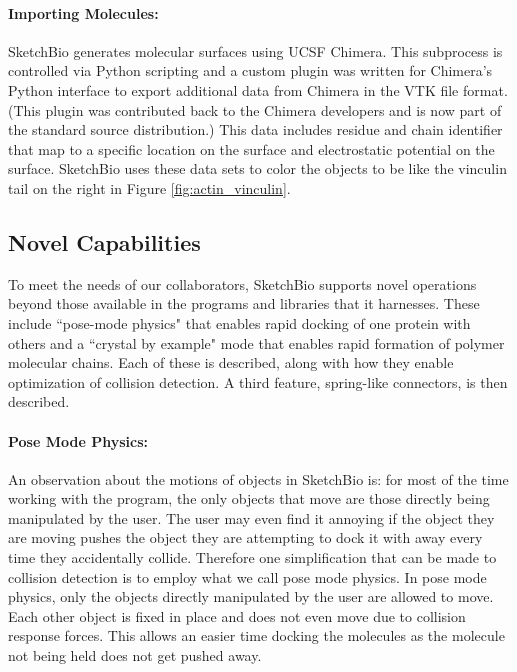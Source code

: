 \documentclass[twocolumn]{bmcart}%
\begin{document}
\paragraph*{Importing Molecules:}
SketchBio generates molecular surfaces using UCSF Chimera.
This subprocess is controlled via Python scripting and a custom plugin was written for Chimera's Python interface to export additional data from Chimera in the VTK file format.
(This plugin was contributed back to the Chimera developers and is now part of the standard source distribution.)
This data includes residue and chain identifier that map to a specific location on the surface and electrostatic potential on the surface.
SketchBio uses these data sets to color the objects to be like the vinculin tail on the right in Figure \ref{fig:actin_vinculin}.

\subsection*{Novel Capabilities}

To meet the needs of our collaborators, SketchBio supports novel operations beyond those available in the programs and libraries that it harnesses.
These include ``pose-mode physics" that enables rapid docking of one protein with others and a ``crystal by example" mode that enables rapid formation of polymer molecular chains.
Each of these is described, along with how they enable optimization of collision detection.  A third feature, spring-like connectors, is then described.

\paragraph*{Pose Mode Physics:}
An observation about the motions of objects in SketchBio is: for most of the time working with the program, the only objects that move are those directly being manipulated by the user.
The user may even find it annoying if the object they are moving pushes the object they are attempting to dock it with away every time they accidentally collide.
Therefore one simplification that can be made to collision detection is to employ what we call pose mode physics.
In pose mode physics, only the objects directly manipulated by the user are allowed to move.
Each other object is fixed in place and does not even move due to collision response forces.
This allows an easier time docking the molecules as the molecule not being held does not get pushed away.
\end{document}
